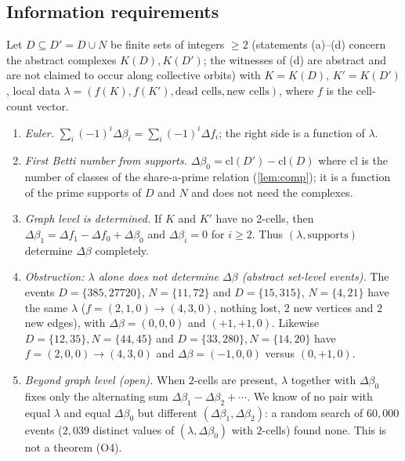 \subsection{Information requirements}
\begin{proposition}\label{prop:P7}
Let $D\subseteq D'=D\cup N$ be finite sets of integers $\ge2$ (statements (a)--(d) concern the abstract complexes $K(D),K(D')$; the witnesses of (d) are abstract and are not claimed to occur along collective orbits) with $K=K(D)$, $K'=K(D')$, local data $\lambda=(f(K),f(K'),\text{dead cells},\text{new cells})$, where $f$ is the cell-count vector.
\begin{enumerate}[label=(\alph*),itemsep=1pt]
\item \emph{Euler.} $\sum_i(-1)^i\Delta\beta_i=\sum_i(-1)^i\Delta f_i$; the right side is a function of $\lambda$.
\item \emph{First Betti number from supports.} $\Delta\beta_0=\mathrm{cl}(D')-\mathrm{cl}(D)$ where $\mathrm{cl}$ is the number of classes of the share-a-prime relation (\cref{lem:comp}); it is a function of the prime supports of $D$ and $N$ and does not need the complexes.
\item \emph{Graph level is determined.} If $K$ and $K'$ have no $2$-cells, then $\Delta\beta_1=\Delta f_1-\Delta f_0+\Delta\beta_0$ and $\Delta\beta_i=0$ for $i\ge2$. Thus $(\lambda,\text{supports})$ determine $\Delta\beta$ completely.
\item \emph{Obstruction: $\lambda$ alone does not determine $\Delta\beta$ (abstract set-level events).} The events $D=\{385,27720\}$, $N=\{11,72\}$ and $D=\{15,315\}$, $N=\{4,21\}$ have the same $\lambda$ ($f=(2,1,0)\to(4,3,0)$, nothing lost, $2$ new vertices and $2$ new edges), with $\Delta\beta=(0,0,0)$ and $(+1,+1,0)$. Likewise $D=\{12,35\},N=\{44,45\}$ and $D=\{33,280\},N=\{14,20\}$ have $f=(2,0,0)\to(4,3,0)$ and $\Delta\beta=(-1,0,0)$ versus $(0,+1,0)$.
\item \emph{Beyond graph level (open).} When $2$-cells are present, $\lambda$ together with $\Delta\beta_0$ fixes only the alternating sum $\Delta\beta_1-\Delta\beta_2+\cdots$. We know of no pair with equal $\lambda$ and equal $\Delta\beta_0$ but different $(\Delta\beta_1,\Delta\beta_2)$: a random search of $60{,}000$ events ($2{,}039$ distinct values of $(\lambda,\Delta\beta_0)$ with $2$-cells) found none. This is not a theorem (O4).
\end{enumerate}
\end{proposition}
